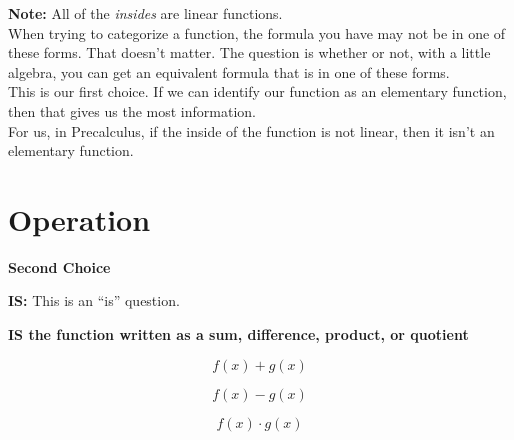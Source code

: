 \documentclass{ximera}
\begin{document}
\textbf{Note:} All of the \textit{insides} are linear functions. \\


When trying to categorize a function, the formula you have may not be in one of these forms.  That doesn't matter.  The question is whether or not, with a little algebra, you can get an equivalent formula that is in one of these forms. \\


This is our first choice.  If we can identify our function as an elementary function, then that gives us the most information. \\


For us, in Precalculus, if the inside of the function is not linear, then it isn't an elementary function. \\







































\section*{Operation}

\textbf{\textcolor{purple!85!blue}{Second Choice}} 


\textbf{\textcolor{purple!70!blue}{IS:}}   This is an ``is'' question. \\

\begin{center}
\textbf{\textcolor{red!80!black}{IS the function written as a sum, difference, product, or quotient}}

\end{center}



\[
f(x) + g(x)
\]


\[
f(x) - g(x)
\]


\[
f(x) \cdot g(x)
\]
\end{document}
